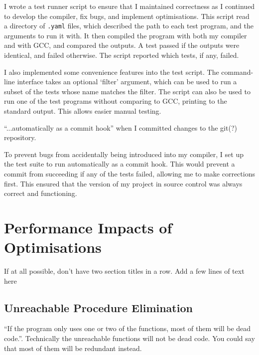 \documentclass[00-main.tex]{subfiles}
\begin{document}
I wrote a test runner script to ensure that I maintained correctness as I continued to develop the compiler, fix bugs, and implement optimisations.
This script read a directory of \texttt{.yaml} files, which described the path to each test program, and the arguments to run it with.
It then compiled the program with both my compiler and with GCC, and compared the outputs.
A test passed if the outputs were identical, and failed otherwise.
The script reported which tests, if any, failed.

I also implemented some convenience features into the test script.
The command-line interface takes an optional `filter' argument, which can be used to run a subset of the tests whose name matches the filter.
The script can also be used to run one of the test programs without comparing to GCC, printing to the standard output. This allows easier manual testing.

\begin{Comment}
``...automatically as a commit hook'' when I committed changes to the git(?) repository.
\end{Comment}

To prevent bugs from accidentally being introduced into my compiler, I set up the test suite to run automatically as a commit hook. This would prevent a commit from succeeding if any of the tests failed, allowing me to make corrections first.
This ensured that the version of my project in source control was always correct and functioning.




\section{Performance Impacts of Optimisations}

\begin{Comment}
If at all possible, don't have two section titles in a row. Add a few lines of text here
\end{Comment}

\subsection{Unreachable Procedure Elimination}

\begin{Comment}
``If the program only uses one or two of the functions, most of them
will be dead code.''.  Technically the unreachable functions will not be
dead code.  You could say that most of them will be redundant instead.
\end{Comment}
\end{document}
